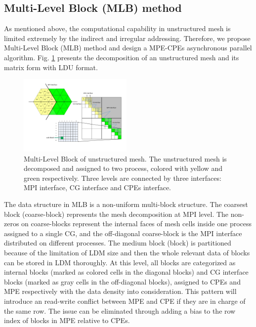 \documentclass[conference]{IEEEtran}
\begin{document}
\subsection{Multi-Level Block (MLB) method}

As mentioned above, the computational capability in unstructured mesh is limited extremely by the indirect and irregular addressing. Therefore, we propose Multi-Level Block (MLB) method and design a MPE-CPEs asynchronous parallel algorithm. Fig. \ref{mlb(overview)} presents the decomposition of an unstructured mesh and its matrix form with LDU format.
\begin{figure}[tbp]
\centerline{\includegraphics[width=0.49\textwidth]{mlb(overview).pdf}}
\caption{Multi-Level Block of unstructured mesh. The unstructured mesh is decomposed and assigned to two process, colored with yellow and green respectively. Three levels are connected by three interfaces: MPI interface, CG interface and CPEs interface.}
\label{mlb(overview)}
\end{figure}
The data structure in MLB is a non-uniform multi-block structure. The coarsest block (coarse-block) represents the mesh decomposition at MPI level. The non-zeros on coarse-blocks represent the internal faces of mesh cells inside one process assigned to a single CG, and the off-diagonal coarse-block is the MPI interface distributed on different processes. The medium block (block) is partitioned because of the limitation of LDM size and then the whole relevant data of blocks can be stored in LDM thoroughly. At this level, all blocks are categorized as internal blocks (marked as colored cells in the diagonal blocks) and CG interface blocks (marked as gray cells in the off-diagonal blocks), assigned to CPEs and MPE respectively with the data density into consideration. This pattern will introduce an read-write conflict between MPE and CPE if they are in charge of the same row. The issue can be eliminated through adding a bias to the row index of blocks in MPE relative to CPEs.
\end{document}
